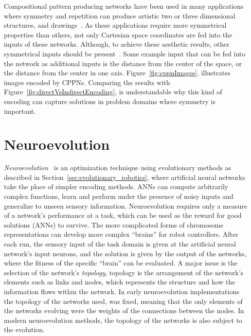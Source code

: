 
Compositional pattern producing networks have been used in many applications where symmetry and repetition can produce artistic two or three dimensional structures\footnotemark[2], and drawings\footnotemark[1]~\citep{secretan2008picbreeder}. As these applications require more symmetrical properties than others, not only Cartesian space coordinates are fed into the inputs of these networks. Although, to achieve these aesthetic results, other symmetrical inputs should be present~\citep{secretan2008picbreeder}. Some example input that can be fed into the network as additional inputs is the distance from the center of the space, or the distance from the center in one axis. Figure~\ref{fig:cppnImages}, illustrates images encoded by CPPNs. Comparing the results with Figure~\ref{fig:directVsIndirectEncoding}, is understandable why this kind of encoding can capture solutions in problem domains where symmetry is important.




\section{Neuroevolution}

\emph{Neuroevolution}~\citep{yao1997new} is an optimization technique using evolutionary methods as described in Section~\ref{sec:evolutionary_robotics}, where artificial neural networks take the place of simpler encoding methods. ANNs can compute arbitrarily complex functions, learn and perform under the presence of noisy inputs and generalize to unseen sensory information. Neuroevolution requires only a measure of a network's performance at a task, which can be used as the reward for good solutions (ANNs) to survive. The more complicated forms of chromosome representations can develop more complex ``brains'' for robot controllers. After each run, the sensory input of the task domain is given at the artificial neural network's input neurons, and the solution is given by the output of the networks, where the fitness of the specific ``brain'' can be evaluated. A major issue is the selection of the network's \emph{topology}, topology is the arrangement of the network's elements such as links and nodes, which represents the structure and how the information flows within the network. In early neuroevolution implementations the topology of the networks used, was fixed, meaning that the only elements of the networks evolving were the weights of the connections between the nodes. In modern neuroevolution methods, the topology of the networks is also subject to the evolution.

